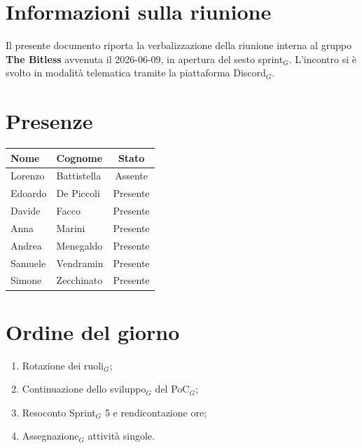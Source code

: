 \documentclass[a4paper, 10pt, colorlinks=true, linkcolor=black, urlcolor=blue, citecolor=blue, hidelinks]{article}
\begin{document}
\newcommand{\titolo}{Verbale interno}
\newcommand{\dataverbale}{2026-06-09}
\newcommand{\dataversione}{2026-06-11}
\newcommand{\versione}{1.0.0}
\newcommand{\stato}{Approvato}
\newcommand{\destinatari}{The Bitless, prof. Tullio Vardanega, prof. Riccardo Cardin}
\def\templatedir{../../../../templates}

\begin{titlepage}

\end{titlepage}

\newpage
\tableofcontents

\newpage
{}
\section{Informazioni sulla riunione}
Il presente documento riporta la verbalizzazione della riunione interna al gruppo \textbf{The Bitless} avvenuta il \dataverbale{}, in apertura del sesto sprint$_G$. L'incontro si è svolto in modalità telematica tramite la piattaforma Discord$_G$.

\section{Presenze}
\begin{center}
\begin{tabular}{|l|l|c|}
\hline
\textbf{Nome} & \textbf{Cognome} & \textbf{Stato} \\
\hline
Lorenzo & Battistella & Assente \\
Edoardo & De Piccoli & Presente \\
Davide & Facco & Presente \\
Anna & Marini & Presente \\
Andrea & Menegaldo & Presente \\
Samuele & Vendramin & Presente \\
Simone & Zecchinato & Presente \\
\hline
\end{tabular}
\end{center}

\section{Ordine del giorno}
\begin{enumerate}
    \item Rotazione dei ruoli$_G$;
    \item Continuazione dello sviluppo$_G$ del PoC$_G$;
    \item Resoconto Sprint$_G$ 5 e rendicontazione ore;
    \item Assegnazione$_G$ attività singole.
\end{enumerate}
\end{document}
